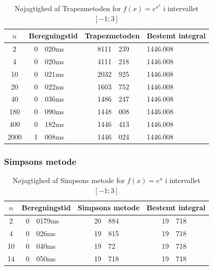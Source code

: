 \documentclass[12pt]{article}
\numberwithin{equation}{section}
\begin{document}
\begin{table}[H]
	\caption {Nøjagtighed af Trapezmetoden for $f(x)=e^{x^2}$ i intervallet $[-1;3]$} 
	\begin{center}
		\begin{tabular}{|c|r@{.}l|r @{.} l|l|}
			\hline $n$ & \multicolumn{2}{|c|}{Beregningstid} & \multicolumn{2}{|c|}{Trapezmetoden} & Bestemt integral
			\\
			\hline 2 & 0&020ms & 8111&239 & 1446.008\\ 
			\hline 4 & 0&020ms & 4111&218 & 1446.008\\ 
			\hline 10 & 0&021ms & 2032&925 & 1446.008\\ 
			\hline 20 & 0&022ms & 1603&752 & 1446.008\\ 
			\hline 40 & 0&036ms & 1486&247 & 1446.008\\ 
			\hline 180 & 0&090ms & 1448&008 & 1446.008\\
			\hline 400 & 0&182ms & 1446&413 & 1446.008\\
			\hline 2000 & 1&008ms & 1446&024 & 1446.008\\
			\hline
		\end{tabular}
	\end{center}
\end{table}
\subsubsection{Simpsons metode}
\begin{table}[H]
	\caption {Nøjagtighed af Simpsons metode for $f(x)=e^x$ i intervallet $[-1;3]$} 
	\begin{center}
		\begin{tabular}{|c|r@{.}l|r @{.} l|r @{.} l|}
			\hline $n$ & \multicolumn{2}{|c|}{Beregningstid} & \multicolumn{2}{|c|}{Simpsons metode} & \multicolumn{2}{|c|}{Bestemt integral}
			\\ 
			\hline 2 & 0&0179ms & 20&884 & 19&718\\ 
			\hline 4 & 0&026ms & 19&815 & 19&718\\ 
			\hline 10 & 0&040ms & 19&72 & 19&718\\ 
			\hline 14 & 0&050ms & 19&718 & 19&718\\ 
			\hline 
		\end{tabular}
	\end{center}
\end{table}
\end{document}
